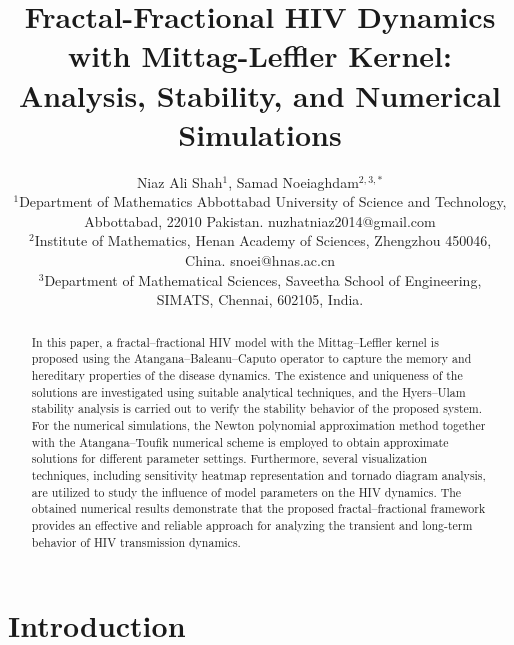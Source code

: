 \documentclass{article}
\title{Fractal-Fractional HIV Dynamics with Mittag-Leffler Kernel: Analysis, Stability, and Numerical Simulations}
\author{Niaz Ali Shah$^{1}$, Samad Noeiaghdam$^{2,3,*}$\\
 \small $^{1}$Department of Mathematics Abbottabad University of Science and Technology, Abbottabad, 22010 Pakistan. nuzhatniaz2014@gmail.com  \\
 \small $^{2}$Institute of Mathematics, Henan Academy of Sciences, Zhengzhou 450046, China. snoei@hnas.ac.cn\\
 \small $^{3}$Department of Mathematical Sciences, Saveetha School of Engineering, SIMATS, Chennai, 602105, India.\\
}
\date{}
\theoremstyle{plain}
\theoremstyle{definition}
\numberwithin{equation}{section}
\begin{document}
\maketitle

\begin{abstract}


In this paper, a fractal--fractional HIV model with the Mittag--Leffler kernel is proposed using the Atangana--Baleanu--Caputo operator to capture the memory and hereditary properties of the disease dynamics. The existence and uniqueness of the solutions are investigated using suitable analytical techniques, and the Hyers--Ulam stability analysis is carried out to verify the stability behavior of the proposed system. For the numerical simulations, the Newton polynomial approximation method together with the Atangana--Toufik numerical scheme is employed to obtain approximate solutions for different parameter settings. Furthermore, several visualization techniques, including sensitivity heatmap representation and tornado diagram analysis, are utilized to study the influence of model parameters on the HIV dynamics. The obtained numerical results demonstrate that the proposed fractal--fractional framework provides an effective and reliable approach for analyzing the transient and long-term behavior of HIV transmission dynamics.




 \vspace{.5cm}{\it keywords:  HIV dynamical model; Fractional order; Atangana-Baleanu-Caputo operator; Sensitivity; }



\end{abstract}







\section{Introduction}\label{sec1}

\end{document}
